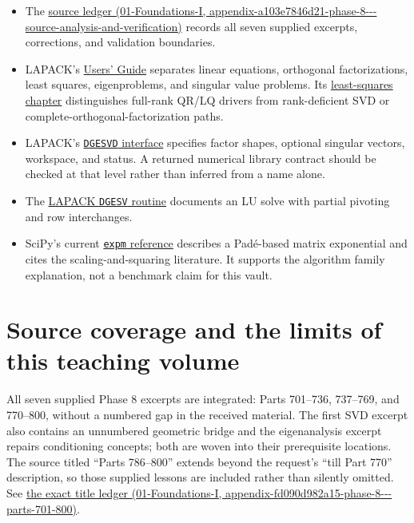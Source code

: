 \begin{itemize}
\tightlist
\item
  The \href{../01-Foundations-I/main.pdf\#nameddest=appendix-a103e7846d21-phase-8---source-analysis-and-verification}{source ledger (01-Foundations-I, appendix-a103e7846d21-phase-8-\/-\/-source-analysis-and-verification)} records all seven supplied excerpts, corrections, and validation boundaries.
\item
  LAPACK's \href{https://netlib.org/lapack/lug/index.html}{Users' Guide} separates linear equations, orthogonal factorizations, least squares, eigenproblems, and singular value problems. Its \href{https://www.netlib.org/lapack/lug/node27.html}{least-squares chapter} distinguishes full-rank QR/LQ drivers from rank-deficient SVD or complete-orthogonal-factorization paths.
\item
  LAPACK's \href{https://netlib.org/lapack/explore-html/d1/d7f/group__gesvd_gac6bd5d4e645049e49bb70691180abf07.html}{\texttt{DGESVD} interface} specifies factor shapes, optional singular vectors, workspace, and status. A returned numerical library contract should be checked at that level rather than inferred from a name alone.
\item
  The \href{https://netlib.org/lapack/explore-html/d8/da6/group__gesv_ga831ce6a40e7fd16295752d18aed2d541.html}{LAPACK \texttt{DGESV} routine} documents an LU solve with partial pivoting and row interchanges.
\item
  SciPy's current \href{https://docs.scipy.org/doc/scipy/reference/generated/scipy.sparse.linalg.expm.html}{\texttt{expm} reference} describes a Padé-based matrix exponential and cites the scaling-and-squaring literature. It supports the algorithm family explanation, not a benchmark claim for this vault.
\end{itemize}

\section{Source coverage and the limits of this teaching volume}\label{02-foundations-ii-ch039-source-coverage-and-the-limits-of-this-teaching-volume}

All seven supplied Phase 8 excerpts are integrated: Parts 701--736, 737--769, and 770--800, without a numbered gap in the received material. The first SVD excerpt also contains an unnumbered geometric bridge and the eigenanalysis excerpt repairs conditioning concepts; both are woven into their prerequisite locations. The source titled ``Parts 786--800'' extends beyond the request's ``till Part 770'' description, so those supplied lessons are included rather than silently omitted. See \href{../01-Foundations-I/main.pdf\#nameddest=appendix-fd090d982a15-phase-8---parts-701-800}{the exact title ledger (01-Foundations-I, appendix-fd090d982a15-phase-8-\/-\/-parts-701-800)}.

